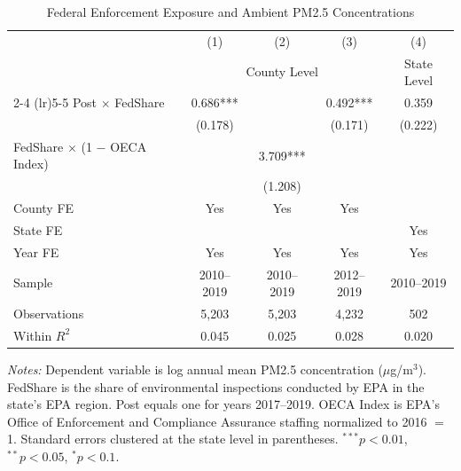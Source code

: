 \begin{table}[htbp]
\centering
\caption{Federal Enforcement Exposure and Ambient PM2.5 Concentrations}
\label{tab:main}
\begin{tabular}{lcccc}
\toprule
& (1) & (2) & (3) & (4) \\
& \multicolumn{3}{c}{County Level} & State Level \\
\cmidrule(lr){2-4} \cmidrule(lr){5-5}
\midrule
Post $\times$ FedShare & 0.686*** & & 0.492*** & 0.359 \\
& (0.178) & & (0.171) & (0.222) \\[6pt]
FedShare $\times$ (1 $-$ OECA Index) & & 3.709*** & & \\
& & (1.208) & & \\[6pt]
\midrule
County FE & Yes & Yes & Yes & \\
State FE & & & & Yes \\
Year FE & Yes & Yes & Yes & Yes \\
Sample & 2010--2019 & 2010--2019 & 2012--2019 & 2010--2019 \\
Observations & 5,203 & 5,203 & 4,232 & 502 \\
Within $R^2$ & 0.045 & 0.025 & 0.028 & 0.020 \\
\bottomrule
\end{tabular}
\par\vspace{4pt}\begin{minipage}{\textwidth}\footnotesize
\textit{Notes:} Dependent variable is log annual mean PM2.5 concentration ($\mu$g/m$^3$). FedShare is the share of environmental inspections conducted by EPA in the state's EPA region. Post equals one for years 2017--2019. OECA Index is EPA's Office of Enforcement and Compliance Assurance staffing normalized to 2016 $=$ 1. Standard errors clustered at the state level in parentheses. $^{***}p<0.01$, $^{**}p<0.05$, $^{*}p<0.1$.
\end{minipage}
\end{table}
